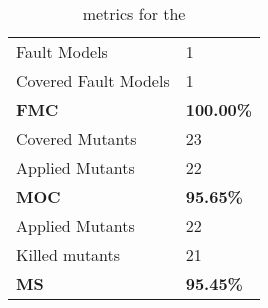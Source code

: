 
\begin{table}[H]

\begin{tabular}{|l|l|}
\hline
Fault Models & 1 \\
Covered Fault Models & 1 \\
\hline
\textbf{FMC} & \textbf{100.00\%} \\
\hline
Covered Mutants & 23 \\
Applied Mutants & 22 \\
\hline
\textbf{MOC} & \textbf{95.65\%} \\
\hline
Applied Mutants & 22 \\
Killed mutants & 21 \\
\hline
\textbf{MS} & \textbf{95.45\%} \\
\hline
\end{tabular}
\caption{\DAMA metrics for the \case}
\label{tab:metrics}
\end{table}
